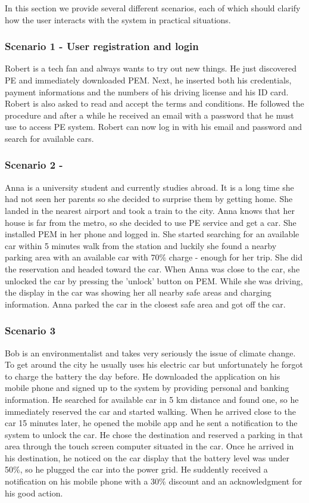 In this section we provide several different scenarios, each of which should clarify how the user interacts with the system in practical situations.

\subsubsection{Scenario 1 - User registration and login}
Robert is a tech fan and always wants to try out new things. He just discovered PE and immediately downloaded PEM. Next, he inserted both his credentials, payment informations and the numbers of his driving license and his ID card. Robert is also asked to read and accept the terms and conditions. He followed the procedure and after a while he received an email with a password that he must use to access PE system. Robert can now log in with his email and password and search for available cars.


\subsubsection{Scenario 2 - }
Anna is a university student and currently studies abroad. It is a long time she had not seen her parents so she decided to surprise them by getting home. She landed in the nearest airport and took a train to the city. Anna knows that her house is far from the metro, so she decided to use PE service and get a car. She installed PEM in her phone and logged in. She started searching for an available car within 5 minutes walk from the station and luckily she found a nearby parking area with an available car with 70\% charge - enough for her trip. She did the reservation and headed toward the car. When Anna was close to the car, she unlocked the car by pressing the 'unlock' button on PEM. While she was driving, the display in the car was showing her all nearby safe areas and charging information. Anna parked the car in the closest safe area and got off the car. 

\subsubsection{Scenario 3}
Bob is an environmentalist and takes very seriously the issue of climate change. To get around the city he usually uses his electric car but unfortunately he forgot to charge the battery the day before. He downloaded the application on his mobile phone and signed up to the system by providing personal and banking information. He searched for available car in 5 km distance and found one, so he immediately reserved the car and started walking. When he arrived close to the car 15 minutes later, he opened the mobile app and he sent a notification to the system to unlock the car. He chose the destination and reserved a parking in that area through the touch screen computer situated in the car. Once he arrived in his destination, he noticed on the car display that the battery level was under 50\%, so he plugged the car into the power grid. He suddently received a notification on his mobile phone with a 30\% discount and an acknowledgment for his good action.

